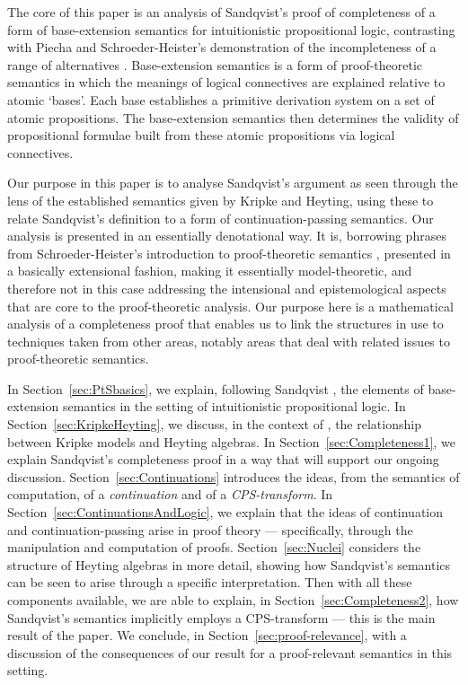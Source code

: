 \documentclass{sn-jnl}
\begin{document}
The core of this paper is an analysis of Sandqvist's \cite{Sandqvist2015base} proof of completeness of a form of base-extension semantics for intuitionistic propositional logic, contrasting with Piecha and Schroeder-Heister's demonstration of the incompleteness of a range of alternatives \cite{Piecha2019incompleteness}. 
Base-extension semantics is a form of proof-theoretic semantics in which the meanings of logical connectives are explained relative to atomic `bases'. Each base establishes a primitive derivation system on a set of atomic propositions. The base-extension semantics then determines the validity of propositional formulae built from these atomic propositions via logical connectives. 

Our purpose in this paper is to analyse Sandqvist's argument as seen through the lens of the established semantics given by Kripke and Heyting, using these to relate Sandqvist's definition to a form of continuation-passing semantics. Our analysis is presented in an essentially denotational way. It is, borrowing phrases from Schroeder-Heister's introduction to proof-theoretic semantics \cite{SEP-PtS}, presented in a basically extensional fashion, making it essentially model-theoretic, and therefore not  in this case addressing the intensional and epistemological aspects that are core to the proof-theoretic analysis. Our purpose here is a mathematical analysis of a completeness proof that enables us to link the structures in use to techniques taken from other areas, notably areas that deal with related issues to proof-theoretic semantics. 

In Section~\ref{sec:PtSbasics}, we explain, following Sandqvist \cite{Sandqvist2015base}, the elements of base-extension semantics in the setting of intuitionistic propositional logic. In Section~\ref{sec:KripkeHeyting}, we discuss, in the context of \cite{Sandqvist2015base}, the relationship between Kripke models and Heyting algebras. In Section~\ref{sec:Completeness1}, we explain Sandqvist's completeness proof in a way that will support our ongoing discussion. Section~\ref{sec:Continuations} introduces the ideas, from the semantics of computation, of a \emph{continuation} and of a \emph{CPS-transform}. 
In Section~\ref{sec:ContinuationsAndLogic}, we explain that the ideas of continuation and continuation-passing arise in proof theory --- specifically, through the manipulation and computation of proofs. Section~\ref{sec:Nuclei} considers 
the structure of Heyting algebras in more detail, showing how Sandqvist's semantics can be seen to arise through a specific interpretation. Then with all these components available, we are able to explain, in Section~\ref{sec:Completeness2}, how Sandqvist's semantics implicitly employs a CPS-transform --- this is the main result of the paper. We conclude, in Section~\ref{sec:proof-relevance}, with a discussion of the consequences of our result for a proof-relevant semantics in this setting. 
\end{document}

